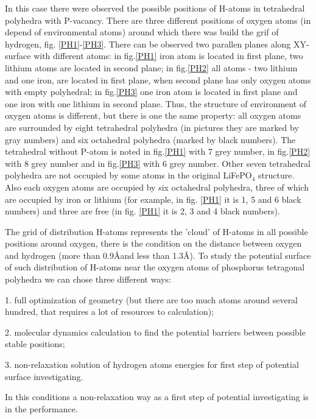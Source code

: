 In this case there were observed the possible positions of H-atoms in tetrahedral polyhedra with P-vacancy. There are three different positions of oxygen atoms (in depend of environmental atoms) around which there was build the grif of hydrogen, fig. \ref{PH1}-\ref{PH3}. There can be observed two parallen planes along XY-surface with different atoms: in fig.\ref{PH1} iron atom is located in first plane, two lithium atoms are located in second plane; in fig.\ref{PH2} all atoms - two lithium and one iron, are located in first plane, when second plane has only oxygen atoms with empty polyhedral; in fig.\ref{PH3} one iron atom is located in first plane and one iron with one lithium in second plane. Thus, the structure of environment of oxygen atoms is different, but there is one the same property: all oxygen atoms are surrounded by eight tetrahedral polyhedra (in pictures they are marked by gray numbers) and six octahedral polyhedra (marked by black numbers). The tetrahedral without P-atom is noted in fig.\ref{PH1} with 7 grey number, in  fig.\ref{PH2} with 8 grey number and  in fig.\ref{PH3} with 6 grey number. Other seven tetrahedral polyhedra are not occupied by some atoms in the original LiFePO$_4$ structure. Also each oxygen atoms are occupied by six octahedral polyhedra, three of which are occupied by iron or lithium (for example, in fig. \ref{PH1} it is 1, 5 and 6 black numbers) and three are free (in fig. \ref{PH1} it is 2, 3 and 4 black numbers).

The grid of distribution H-atoms represents the 'cloud' of H-atoms in all possible positions around oxygen, there is the condition on the distance between oxygen and hydrogen (more than 0.9\AA and less than 1.3\AA). To study the potential surface of such distribution of H-atoms near the oxygen atoms of phosphorus tetragonal polyhedra we can chose three different ways:

1. full optimization of geometry (but there are too much atoms around several hundred, that requires a lot of resources to calculation);

2. molecular dynamics calculation to find the potential barriers between possible stable positions;

3. non-relaxation solution of hydrogen atoms energies for first step of potential surface investigating.

In this conditions a non-relaxation way as a first step of potential investigating is in the performance. 
   

